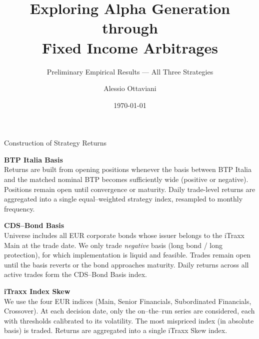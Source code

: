 \documentclass[aspectratio=169,11pt]{beamer}
\title[Fixed Income Arbitrage Alpha]{Exploring Alpha Generation through \\ Fixed Income Arbitrages}
\subtitle{Preliminary Empirical Results — All Three Strategies}
\author{Alessio Ottaviani}
\institute[EDHEC Business School]{
    EDHEC Business School \\
    \medskip
    \textit{Supervisor: Prof. Riccardo Rebonato}
}
\date{\today}
\begin{document}



\begin{frame}
    \titlepage
\end{frame}
\begin{frame}[t]{Construction of Strategy Returns}
\small

\textbf{BTP Italia Basis}\\
Returns are built from opening positions whenever the basis between BTP Italia and the matched nominal BTP becomes sufficiently wide (positive or negative).  
Positions remain open until convergence or maturity.  
Daily trade-level returns are aggregated into a single equal–weighted strategy index, resampled to monthly frequency.

\vspace{0.35cm}

\textbf{CDS--Bond Basis}\\
Universe includes all EUR corporate bonds whose issuer belongs to the iTraxx Main at the trade date.  
We only trade \textit{negative} basis (long bond / long protection), for which implementation is liquid and feasible.  
Trades remain open until the basis reverts or the bond approaches maturity.  
Daily returns across all active trades form the CDS–Bond Basis index.

\vspace{0.35cm}

\textbf{iTraxx Index Skew}\\
We use the four EUR indices (Main, Senior Financials, Subordinated Financials, Crossover).  
At each decision date, only the on–the–run series are considered, each with thresholds calibrated to its volatility.  
The most mispriced index (in absolute basis) is traded.  
Returns are aggregated into a single iTraxx Skew index.

\end{frame}
\end{document}
